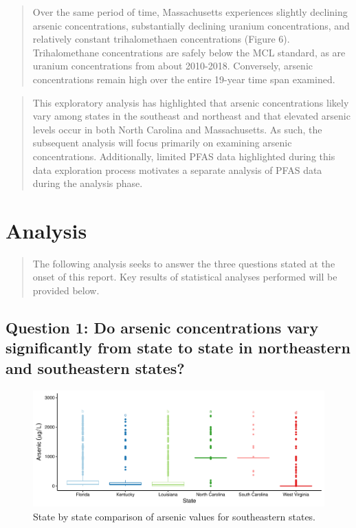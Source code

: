 \documentclass[12pt,]{article}
\begin{document}
\begin{quote}
Over the same period of time, Massachusetts experiences slightly
declining arsenic concentrations, substantially declining uranium
concentrations, and relatively constant trihalomethaen concentrations
(Figure 6). Trihalomethane concentrations are safely below the MCL
standard, as are uranium concentrations from about 2010-2018.
Conversely, arsenic concentrations remain high over the entire 19-year
time span examined.
\end{quote}

\begin{quote}
This exploratory analysis has highlighted that arsenic concentrations
likely vary among states in the southeast and northeast and that
elevated arsenic levels occur in both North Carolina and Massachusetts.
As such, the subsequent analysis will focus primarily on examining
arsenic concentrations. Additionally, limited PFAS data highlighted
during this data exploration process motivates a separate analysis of
PFAS data during the analysis phase.
\end{quote}

\newpage

\hypertarget{analysis}{%
\section{Analysis}\label{analysis}}

\begin{quote}
The following analysis seeks to answer the three questions stated at the
onset of this report. Key results of statistical analyses performed will
be provided below.
\end{quote}

\hypertarget{question-1-do-arsenic-concentrations-vary-significantly-from-state-to-state-in-northeastern-and-southeastern-states}{%
\subsection{Question 1: Do arsenic concentrations vary significantly
from state to state in northeastern and southeastern
states?}\label{question-1-do-arsenic-concentrations-vary-significantly-from-state-to-state-in-northeastern-and-southeastern-states}}

\begin{figure}
\centering
\includegraphics{Project_Template_files/figure-latex/figs7-1.pdf}
\caption{State by state comparison of arsenic values for southeastern
states.}
\end{figure}
\end{document}

